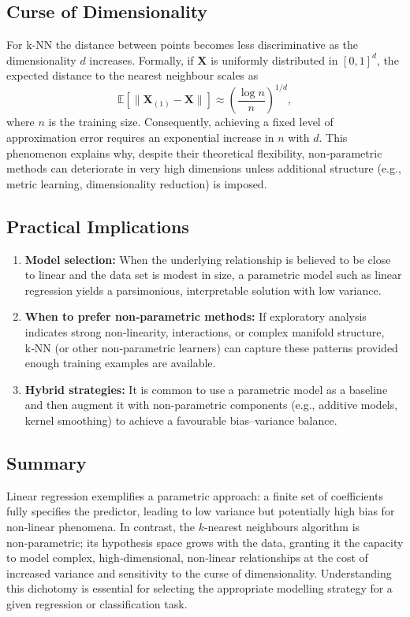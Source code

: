 \documentclass[12pt, a4paper]{article}
\begin{document}
\subsection{Curse of Dimensionality}
For k‑NN the distance between points becomes less discriminative as the dimensionality \(d\) increases.  Formally, if \(\mathbf{X}\) is uniformly distributed in \([0,1]^{d}\), the expected distance to the nearest neighbour scales as
\[
\mathbb{E}[\|\mathbf{X}_{(1)}-\mathbf{X}\|] \approx \left(\frac{\log n}{n}\right)^{1/d},
\]
where \(n\) is the training size.  Consequently, achieving a fixed level of approximation error requires an exponential increase in \(n\) with \(d\).  This phenomenon explains why, despite their theoretical flexibility, non‑parametric methods can deteriorate in very high dimensions unless additional structure (e.g., metric learning, dimensionality reduction) is imposed.

\subsection{Practical Implications}
\begin{enumerate}
    \item \textbf{Model selection:} When the underlying relationship is believed to be close to linear and the data set is modest in size, a parametric model such as linear regression yields a parsimonious, interpretable solution with low variance.
    \item \textbf{When to prefer non‑parametric methods:} If exploratory analysis indicates strong non‑linearity, interactions, or complex manifold structure, k‑NN (or other non‑parametric learners) can capture these patterns provided enough training examples are available.
    \item \textbf{Hybrid strategies:} It is common to use a parametric model as a baseline and then augment it with non‑parametric components (e.g., additive models, kernel smoothing) to achieve a favourable bias–variance balance.
\end{enumerate}

\subsection{Summary}
Linear regression exemplifies a parametric approach: a finite set of coefficients fully specifies the predictor, leading to low variance but potentially high bias for non‑linear phenomena.  In contrast, the \(k\)-nearest neighbours algorithm is non‑parametric; its hypothesis space grows with the data, granting it the capacity to model complex, high‑dimensional, non‑linear relationships at the cost of increased variance and sensitivity to the curse of dimensionality.  Understanding this dichotomy is essential for selecting the appropriate modelling strategy for a given regression or classification task.
\end{document}
